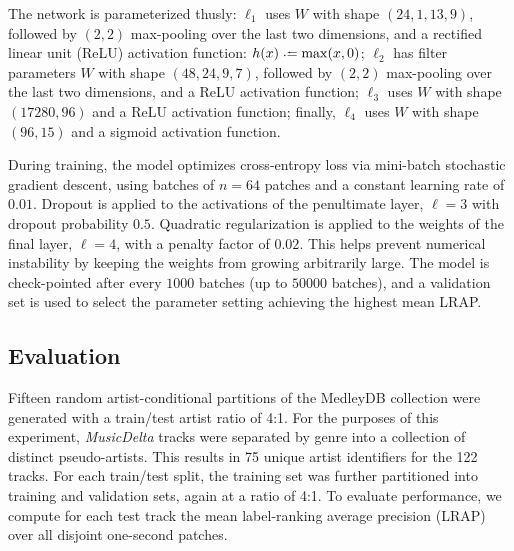 \documentclass{article}
\begin{document}
The network is parameterized thusly:
$\ell_1$ uses $W$ with shape $(24, 1, 13, 9)$, followed by $(2, 2)$ max-pooling over the last two
dimensions, and a rectified linear unit (ReLU) activation function: $h(x) \defeq \max(x, 0)$;
$\ell_2$ has filter parameters $W$ with shape $(48, 24, 9, 7)$, followed by $(2, 2)$ max-pooling over the last two dimensions, and a ReLU activation function;
$\ell_3$ uses $W$ with shape $(17280, 96)$ and a ReLU activation function;
finally, $\ell_4$ uses $W$ with shape $(96, 15)$ and a sigmoid activation function.

During training, the model optimizes cross-entropy loss via mini-batch stochastic
gradient descent, using batches of $n=64$ patches and a constant learning rate of $0.01$.
Dropout is applied to the activations of the penultimate layer, $\ell=3$ with dropout
probability $0.5$.
Quadratic regularization is applied to the weights of the final layer, $\ell=4$, with a
penalty factor of $0.02$. This helps prevent numerical instability by keeping
the weights from growing arbitrarily large.
The model is check-pointed after every $1000$ batches (up to $50000$ batches), and a 
validation set is used to select the parameter setting achieving the highest mean LRAP.

\subsection{Evaluation}

Fifteen random artist-conditional partitions of the MedleyDB collection were generated with
a train/test artist ratio of 4:1.  For the purposes of this experiment,
\emph{MusicDelta} tracks were separated by genre into a collection of distinct 
pseudo-artists. 
This results in 75 unique artist identifiers for the 122 tracks.
For each train/test split, the training set was further partitioned into
training and validation sets, again at a ratio of 4:1.
To evaluate performance, we compute for each test track the mean label-ranking average
precision (LRAP) over all disjoint one-second patches.
\end{document}
